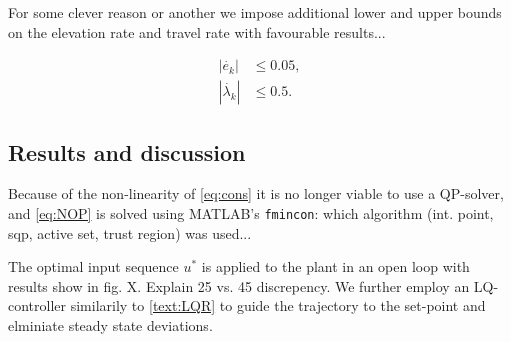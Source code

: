 For some clever reason or another we impose additional lower and upper bounds on the elevation rate and travel rate with favourable results...

\begin{align*}
	|\dot{e_k}| &\le 0.05, \\
	|\dot{\lambda_k}| &\le 0.5.
\end{align*}
\subsection{Results and discussion}
 Because of the non-linearity of \eqref{eq:cons} it is no longer viable to use a QP-solver, and \eqref{eq:NOP} is solved using MATLAB's \texttt{fmincon}: which algorithm (int. point, sqp, active set, trust region) was used...

The optimal input sequence $u^*$ is applied to the plant in an open loop with results show in fig. X. Explain 25 vs. 45 discrepency. We further employ an LQ-controller similarily to \ref{text:LQR} to guide the trajectory to the set-point and elminiate steady state deviations.



